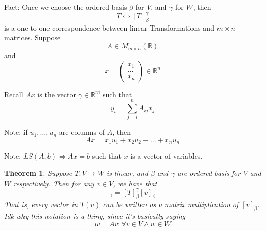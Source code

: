 \documentclass{article}
\newtheorem{theorem}{Theorem}[section]
\newtheorem{one minute paper}[theorem]{One Minute Paper}
\begin{document}
Fact: Once we choose the ordered basis $\beta$ for $V$, and $\gamma$ for $W$, then
\begin{equation}
    T \iff [T]_\beta^\gamma
\end{equation}
is a one-to-one correspondence between linear Transformations and $m \times n$ matrices. Suppose 
\begin{equation}
     A \in M_{m \times n}(\mathbb{R})
\end{equation}
and 
\begin{equation}
    x = \begin{pmatrix}
        x_1 \\
        \dots \\
        x_n
    \end{pmatrix} \in \mathbb{R}^n
\end{equation}

Recall $Ax$ is the vector $\gamma \in \mathbb{R}^m$ such that 
\begin{equation}
    y_i = \sum_{j = i}^{n}A_{ij}x_j
\end{equation}

Note: if $u_1, \dots, u_n$ are columns of $A$, then 
\begin{equation}
    Ax = x_1u_1 + x_2u_2 + \dots + x_nu_n
\end{equation}

Note: $LS(A,b) \iff Ax = b$ such that $x$ is a vector of variables. 

\begin{theorem}
    Suppose $T: V \rightarrow W$ is linear, and $\beta$ and $\gamma$ are ordered basis for $V$ and $W$ respectively. Then for any $v \in V$, we have that 
    \begin{equation}
        [T(v)]_\gamma = [T]_\beta^\gamma [v]_\beta
    \end{equation}
    That is, every vector in $T(v)$ can be written as a matrix multiplication of $[v]_\beta$. Idk why this notation is a thing, since it's basically saying
    \begin{equation}
        w = Av : \forall v \in V \land w \in W
    \end{equation}
\end{theorem}
\end{document}
